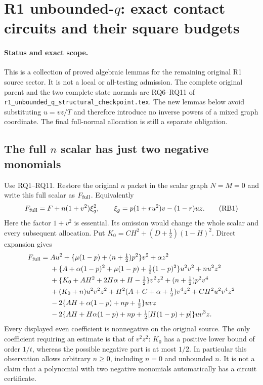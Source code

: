 \section{R1 unbounded-$q$: exact contact circuits and their square budgets}
\label{sec:r1-qo-contact-circuit-budgets}

\paragraph{Status and exact scope.}
This is a collection of proved algebraic lemmas for the remaining
original R1 source sector. It is not a local or all-testing admission.
The complete original parent and the two complete state normals are
RQ6--RQ11 of \texttt{r1\_unbounded\_q\_structural\_checkpoint.tex}.
The new lemmas below avoid substituting $u=vz/T$ and therefore introduce
no inverse powers of a mixed graph coordinate. The final full-normal
allocation is still a separate obligation.

\subsection{The full $n$ scalar has just two negative monomials}

Use RQ1--RQ11. Restore the original $n$ packet in the scalar graph
$N=M=0$ and write this full scalar as $F_{\rm full}$. Equivalently
\[
 F_{\rm full}=F+n(1+v^2)\xi_g^2,\qquad
 \xi_g=p(1+ru^2)v-(1-r)uz.
 \tag{RB1}
\]
Here the factor $1+v^2$ is essential. Its omission would change the
whole scalar and every subsequent allocation.
Put $K_0=CH^2+(D+\tfrac12)(1-H)^2$. Direct expansion gives
\begin{align*}
F_{\rm full}={}&
 Au^2+\{\mu(1-p)+(n+\tfrac12)p^2\}v^2+\alpha z^2\\
&+\{A+\alpha(1-p)^2+\mu(1-p)+\tfrac12(1-p)^2\}u^2v^2
 +nu^2z^2\\
&+\{K_0+AH^2+2H\alpha+H-\tfrac12\}v^2z^2
 +(n+\tfrac12)p^2v^4\\
&+(K_0+n)u^2v^2z^2
 +H^2(A+C+\alpha+\tfrac12)v^4z^2
 +CH^2u^2v^4z^2\\
&-2\{AH+\alpha(1-p)+np+\tfrac12\}uvz\\
&-2\{AH+H\alpha(1-p)+np+
                  \tfrac12[H(1-p)+p]\}uv^3z .
\end{align*}
Every displayed even coefficient is nonnegative on the original
source. The only coefficient requiring an estimate is that of
$v^2z^2$: $K_0$ has a positive lower bound of order $1/t$, whereas
the possible negative part is at most $1/2$. In particular this
observation allows arbitrary $n\ge0$, including $n=0$ and unbounded
$n$. It is not a claim that a polynomial with two negative monomials
automatically has a circuit certificate.

